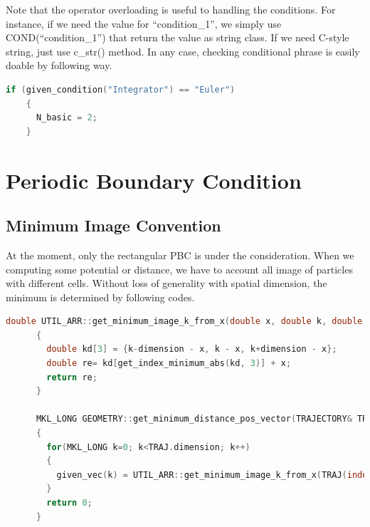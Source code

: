 \documentclass[10pt, a4paper]{article}
\begin{document}
\begin{appendices}
  Note that the operator overloading is useful to handling the conditions. For instance, if we need the value for ``condition{\_}1'', we simply use COND(``condition{\_}1'') that return the value as string class. If we need C-style string, just use c{\_}str() method. In any case, checking conditional phrase is easily doable by following way.
  \begin{lstlisting}[language=C++, frame=single]
    if (given_condition("Integrator") == "Euler")
    {
      N_basic = 2;
    }
  \end{lstlisting}
  
  \section{Periodic Boundary Condition}
  \subsection{Minimum Image Convention}
    At the moment, only the rectangular PBC is under the consideration. When we computing some potential or distance, we have to account all image of particles with different cells. Without loss of generality with spatial dimension, the minimum is determined by following codes.
    \begin{lstlisting}[language=C++, frame=single]
      double UTIL_ARR::get_minimum_image_k_from_x(double x, double k, double dimension)
      {
        double kd[3] = {k-dimension - x, k - x, k+dimension - x};
        double re= kd[get_index_minimum_abs(kd, 3)] + x;
        return re;
      }

      MKL_LONG GEOMETRY::get_minimum_distance_pos_vector(TRAJECTORY& TRAJ, MKL_LONG index_t, MKL_LONG given_index, MKL_LONG target_index, MATRIX& given_vec)
      {
        for(MKL_LONG k=0; k<TRAJ.dimension; k++)
        {
          given_vec(k) = UTIL_ARR::get_minimum_image_k_from_x(TRAJ(index_t, given_index, k), TRAJ(index_t, target_index, k), TRAJ.box_dimension[k]);
        }
        return 0;
      }
    \end{lstlisting}

\end{appendices}
\end{document}

